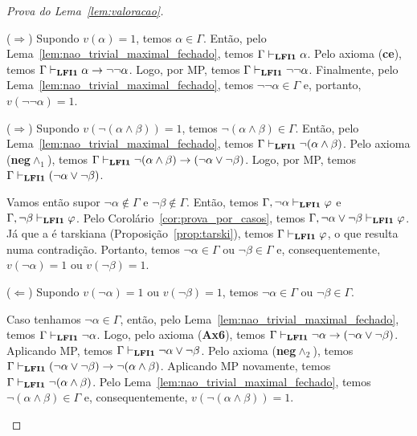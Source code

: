 \begin{proof}[Prova do Lema~\ref{lem:valoracao}]
\begin{provaporcasos}
\begin{adjustwidth}{1cm}{}
                        \noindent ($\Longrightarrow$) Supondo $v(\alpha) = 1$, temos $\alpha \in \Gamma$. Então, pelo Lema~\ref{lem:nao_trivial_maximal_fechado}, temos $\Gamma \vdash_{{\normalfont\textbf{LFI1}}{}} \alpha$. Pelo axioma (\textbf{ce}), temos $\Gamma \vdash_{{\normalfont\textbf{LFI1}}{}} \alpha \to \neg \neg \alpha$. Logo, por MP, temos $\Gamma \vdash_{{\normalfont\textbf{LFI1}}{}} \neg \neg \alpha$. Finalmente, pelo Lema~\ref{lem:nao_trivial_maximal_fechado}, temos $\neg \neg \alpha \in \Gamma$ e, portanto, $v(\neg \neg \alpha) = 1$.

                    \end{adjustwidth}


                    \begin{adjustwidth}{1cm}{}
                        
                        \noindent ($\Longrightarrow$) Supondo $v(\neg (\alpha \land \beta)) = 1$, temos $\neg (\alpha \land \beta) \in \Gamma$. Então, pelo Lema~\ref{lem:nao_trivial_maximal_fechado}, temos $\Gamma \vdash_{{\normalfont\textbf{LFI1}}{}} \neg (\alpha \land \beta)$. Pelo axioma (\textbf{neg}$\land_1$), temos $\Gamma \vdash_{{\normalfont\textbf{LFI1}}{}} \neg (\alpha \land \beta) \to (\neg \alpha \lor \neg \beta)$. Logo, por MP, temos $\Gamma \vdash_{{\normalfont\textbf{LFI1}}{}} (\neg \alpha \lor \neg \beta)$.

                        \noindent Vamos então supor $\neg \alpha \not \in \Gamma$ e $\neg \beta \not \in \Gamma$. Então, temos $\Gamma, \neg \alpha \vdash_{{\normalfont\textbf{LFI1}}{}} \varphi$ e $\Gamma, \neg \beta \vdash_{{\normalfont\textbf{LFI1}}{}} \varphi$. Pelo Corolário~\ref{cor:prova_por_casos}, temos $\Gamma, \neg \alpha \lor \neg \beta \vdash_{{\normalfont\textbf{LFI1}}{}} \varphi$. Já que a \lfium{} é tarskiana (Proposição~\ref{prop:tarski}), temos $\Gamma \vdash_{{\normalfont\textbf{LFI1}}{}} \varphi$, o que resulta numa contradição. Portanto, temos $\neg \alpha \in \Gamma$ ou $\neg \beta \in \Gamma$ e, consequentemente, $v(\neg \alpha) = 1$ ou $v(\neg \beta) = 1$.
                        
                        \noindent ($\Longleftarrow$) Supondo $v(\neg \alpha) = 1$ ou $v(\neg \beta) = 1$, temos $\neg \alpha \in \Gamma$ ou $\neg \beta \in \Gamma$.

                        \noindent Caso tenhamos $\neg \alpha \in \Gamma$, então, pelo Lema~\ref{lem:nao_trivial_maximal_fechado}, temos $\Gamma \vdash_{{\normalfont\textbf{LFI1}}{}} \neg \alpha$. Logo, pelo axioma (\textbf{Ax6}), temos $\Gamma \vdash_{{\normalfont\textbf{LFI1}}{}} \neg \alpha \to (\neg \alpha \lor \neg \beta)$. Aplicando MP, temos $\Gamma \vdash_{{\normalfont\textbf{LFI1}}{}} \neg \alpha \lor \neg \beta$. Pelo axioma (\textbf{neg}$\land_2$), temos $\Gamma \vdash_{{\normalfont\textbf{LFI1}}{}} (\neg \alpha \lor \neg \beta) \to \neg (\alpha \land \beta)$. Aplicando MP novamente, temos $\Gamma \vdash_{{\normalfont\textbf{LFI1}}{}} \neg (\alpha \land \beta)$. Pelo Lema~\ref{lem:nao_trivial_maximal_fechado}, temos $\neg (\alpha \land \beta) \in \Gamma$ e, consequentemente, $v(\neg (\alpha \land \beta)) = 1$.


\end{adjustwidth}
\end{provaporcasos}
\end{proof}
